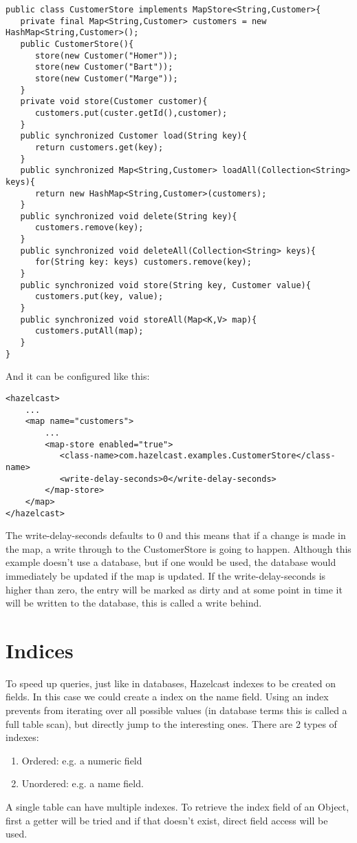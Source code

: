 \begin{verbatim}
public class CustomerStore implements MapStore<String,Customer>{
   private final Map<String,Customer> customers = new HashMap<String,Customer>();
   public CustomerStore(){
      store(new Customer("Homer"));
      store(new Customer("Bart"));
      store(new Customer("Marge"));
   }
   private void store(Customer customer){
      customers.put(custer.getId(),customer);
   }
   public synchronized Customer load(String key){
      return customers.get(key);
   }
   public synchronized Map<String,Customer>	loadAll(Collection<String> keys){
      return new HashMap<String,Customer>(customers);
   }
   public synchronized void delete(String key){
      customers.remove(key);
   } 
   public synchronized void deleteAll(Collection<String> keys){
      for(String key: keys) customers.remove(key);
   } 
   public synchronized void store(String key, Customer value){
      customers.put(key, value);
   } 
   public synchronized void storeAll(Map<K,V> map){
      customers.putAll(map);
   }   
}
\end{verbatim}

And it can be configured like this:

\begin{verbatim}
<hazelcast>
    ...
    <map name="customers">
        ...
        <map-store enabled="true">
           <class-name>com.hazelcast.examples.CustomerStore</class-name>
           <write-delay-seconds>0</write-delay-seconds>
        </map-store>
    </map>
</hazelcast>
\end{verbatim}

The write-delay-seconds defaults to 0 and this means that if a change is made in the map, a write through to the CustomerStore is going to happen. Although this example doesn't use a database, but if one would be used, the database would immediately be updated if the map is updated. If the write-delay-seconds is higher than zero, the entry will be marked as dirty and at some point in time it will be written to the database, this is called a write behind.

\section{Indices}

To speed up queries, just like in databases, Hazelcast indexes to be created on fields. In this case we could create a index on the name field. Using an index prevents from iterating over all possible values (in database terms this is called a full table scan), but directly jump to the interesting ones. There are 2 types of indexes:
\begin{enumerate}
\item Ordered: e.g. a numeric field
\item Unordered: e.g. a name field.
\end{enumerate}
A single table can have multiple indexes. To retrieve the index field of an Object, first a getter will be tried and if that doesn't exist, direct field access will be used.

